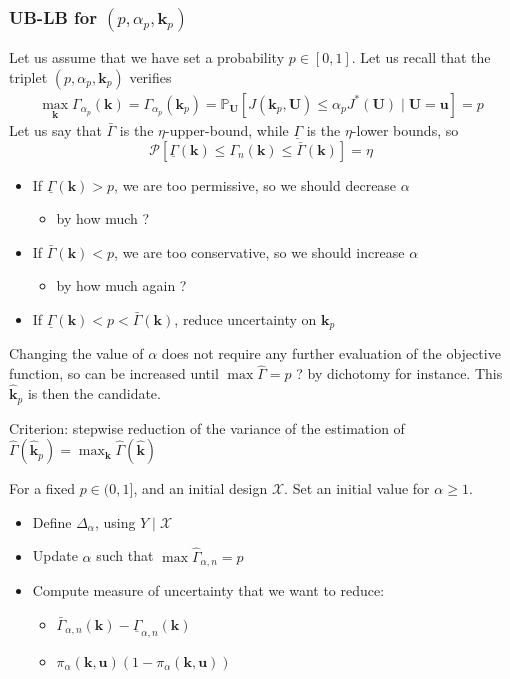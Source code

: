 \documentclass[a4paper,11pt]{article}
\newcommand{\Prob}{\mathbb{P}}
\newcommand{\ProbGP}{\mathcal{P}}
\theoremstyle{defi}
\numberwithin{thmCounter}{section}
\begin{document}
\subsubsection{UB-LB for $(p, \alpha_p, \mathbf{k}_p)$}
Let us assume that we have set a probability $p\in [0,1]$. Let us recall that the triplet $(p, \alpha_p, \mathbf{k}_p)$ verifies
\begin{align}
  \max_{\mathbf{k}} \Gamma_{\alpha_p}(\mathbf{k}) = \Gamma_{\alpha_p}(\mathbf{k}_p) = \Prob_{\mathbf{U}}\left[J(\mathbf{k}_p,\mathbf{U}) \leq \alpha_p J^*(\mathbf{U})\mid \mathbf{U} = \mathbf{u}\right] = p
\end{align}
Let us say that $\bar{\Gamma}$ is the $\eta$-upper-bound, while $\underline{\Gamma}$ is the $\eta$-lower bounds, so
\begin{equation}
  \ProbGP\left[\underline{\Gamma}(\mathbf{k}) \leq \Gamma_n(\mathbf{k}) \leq \bar{\Gamma}(\mathbf{k})\right] = \eta
\end{equation}
\begin{itemize}
\item If $\underline{\Gamma}(\mathbf{k})>p$, we are too permissive, so we should decrease $\alpha$
  \begin{itemize}
  \item by how much ?
  \end{itemize}
\item If $\bar{\Gamma}(\mathbf{k})<p$, we are too conservative, so we should increase $\alpha$
  \begin{itemize}
  \item by how much again ?
  \end{itemize}
 \item If $\underline{\Gamma}(\mathbf{k})<p<\bar{\Gamma}(\mathbf{k})$, reduce uncertainty on $\mathbf{k}_p$
\end{itemize}
Changing the value of $\alpha$ does not require any further evaluation of the objective function, so can be increased until $\max \hat{\Gamma} = p$ ? by dichotomy for instance. This $\hat{\mathbf{k}}_p$ is then the candidate.

Criterion: stepwise reduction of the variance of the estimation of $\hat{\Gamma}(\hat{\mathbf{k}}_p) = \max_{\mathbf{k}}\hat{\Gamma}(\hat{\mathbf{k}})$

For a fixed $p\in (0, 1]$, and an initial design $\mathcal{X}$. Set an initial value for $\alpha \geq 1$. 
\begin{itemize}
\item Define $\Delta_{\alpha}$, using $Y \mid \mathcal{X}$
\item Update $\alpha$ such that $\max \hat{\Gamma}_{\alpha,n} = p$
\item Compute measure of uncertainty that we want to reduce:
  \begin{itemize}
  \item $\bar{\Gamma}_{\alpha,n}(\mathbf{k}) - \underline{\Gamma}_{\alpha,n}(\mathbf{k})$
  \item $\pi_{\alpha}(\mathbf{k},\mathbf{u})(1-\pi_{\alpha}(\mathbf{k},\mathbf{u}))$
  \end{itemize}
\end{itemize}
\end{document}
